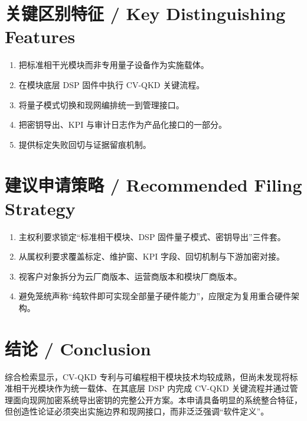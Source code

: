 ﻿\documentclass[12pt,a4paper]{article}
\begin{document}
\section{关键区别特征 / Key Distinguishing Features}
\begin{enumerate}
\item 把标准相干光模块而非专用量子设备作为实施载体。
\item 在模块底层 DSP 固件中执行 CV-QKD 关键流程。
\item 将量子模式切换和现网编排统一到管理接口。
\item 把密钥导出、KPI 与审计日志作为产品化接口的一部分。
\item 提供标定失败回切与证据留痕机制。
\end{enumerate}

\section{建议申请策略 / Recommended Filing Strategy}
\begin{enumerate}
\item 主权利要求锁定“标准相干模块、DSP 固件量子模式、密钥导出”三件套。
\item 从属权利要求覆盖标定、维护窗、KPI 字段、回切机制与下游加密对接。
\item 视客户对象拆分为云厂商版本、运营商版本和模块厂商版本。
\item 避免笼统声称“纯软件即可实现全部量子硬件能力”，应限定为复用重合硬件架构。
\end{enumerate}

\section{结论 / Conclusion}
综合检索显示，CV-QKD 专利与可编程相干模块技术均较成熟，但尚未发现将标准相干光模块作为统一载体、在其底层 DSP 内完成 CV-QKD 关键流程并通过管理面向现网加密系统导出密钥的完整公开方案。本申请具备明显的系统整合特征，但创造性论证必须突出实施边界和现网接口，而非泛泛强调“软件定义”。
\end{document}
